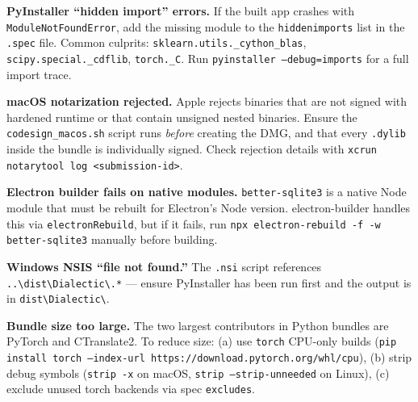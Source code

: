 \documentclass[11pt,letterpaper]{article}
\newcommand{\file}[1]{\texttt{#1}}
\newcommand{\cmd}[1]{\texttt{#1}}
\begin{document}
\textbf{PyInstaller ``hidden import'' errors.} If the built app crashes with \cmd{ModuleNotFoundError}, add the missing module to the \cmd{hiddenimports} list in the \file{.spec} file. Common culprits: \cmd{sklearn.utils.\_cython\_blas}, \cmd{scipy.special.\_cdflib}, \cmd{torch.\_C}. Run \cmd{pyinstaller --debug=imports} for a full import trace.

\textbf{macOS notarization rejected.} Apple rejects binaries that are not signed with hardened runtime or that contain unsigned nested binaries. Ensure the \file{codesign\_macos.sh} script runs \emph{before} creating the DMG, and that every \file{.dylib} inside the bundle is individually signed. Check rejection details with \cmd{xcrun notarytool log <submission-id>}.

\textbf{Electron builder fails on native modules.} \cmd{better-sqlite3} is a native Node module that must be rebuilt for Electron's Node version. electron-builder handles this via \cmd{electronRebuild}, but if it fails, run \cmd{npx electron-rebuild -f -w better-sqlite3} manually before building.

\textbf{Windows NSIS ``file not found.''} The \file{.nsi} script references \file{..\textbackslash dist\textbackslash Dialectic\textbackslash *.*} --- ensure PyInstaller has been run first and the output is in \file{dist\textbackslash Dialectic\textbackslash}.

\textbf{Bundle size too large.} The two largest contributors in Python bundles are PyTorch and CTranslate2. To reduce size: (a) use \cmd{torch} CPU-only builds (\cmd{pip install torch --index-url https://download.pytorch.org/whl/cpu}), (b) strip debug symbols (\cmd{strip -x} on macOS, \cmd{strip --strip-unneeded} on Linux), (c) exclude unused torch backends via spec \cmd{excludes}.
\end{document}

